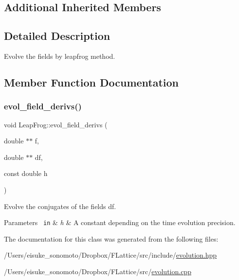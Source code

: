 \subsection*{Additional Inherited Members}


\subsection{Detailed Description}
Evolve the fields by leapfrog method. 

\subsection{Member Function Documentation}
\mbox{\label{class_leap_frog_a0798b7d6bfdf2f19e5bce08c4ce17d29}} 
\subsubsection{\texorpdfstring{evol\_field\_derivs()}{evol\_field\_derivs()}}
{\footnotesize\ttfamily void Leap\+Frog\+::evol\+\_\+field\+\_\+derivs (\begin{DoxyParamCaption}\item[{double $\ast$$\ast$}]{f,  }\item[{double $\ast$$\ast$}]{df,  }\item[{const double}]{h }\end{DoxyParamCaption})\hspace{0.3cm}{\ttfamily [private]}}



Evolve the conjugates of the fields df. 


\begin{DoxyParams}[1]{Parameters}
\mbox{\texttt{ in}}  & {\em h} & A constant depending on the time evolution precision. \\
\hline
\end{DoxyParams}


The documentation for this class was generated from the following files\+:\begin{DoxyCompactItemize}
\item 
/\+Users/eisuke\+\_\+sonomoto/\+Dropbox/\+F\+Lattice/src/include/\mbox{\hyperlink{evolution_8hpp}{evolution.\+hpp}}\item 
/\+Users/eisuke\+\_\+sonomoto/\+Dropbox/\+F\+Lattice/src/\mbox{\hyperlink{evolution_8cpp}{evolution.\+cpp}}\end{DoxyCompactItemize}
